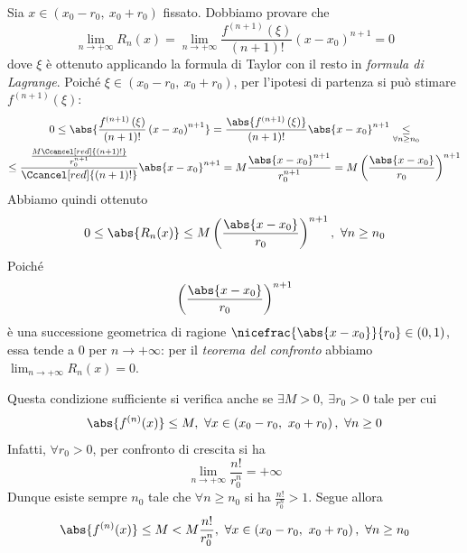 \begin{demonstration}
	Sia $x\in\left(x_0-r_0,\ x_0+r_0\right)$ fissato. Dobbiamo provare che
	\begin{equation*}
		\lim_{n\to+\infty}R_n(x)=\lim_{n\to+\infty}\frac{f^{\left(n+1\right)}\left(\xi\right)}{\left(n+1\right)!}\left(x-x_0\right)^{n+1}=0
	\end{equation*}
dove $\xi$ è ottenuto applicando la formula di Taylor con il resto in \textit{formula di Lagrange}. Poiché $\xi\in\left(x_0-r_0,\ x_0+r_0\right)$, per l'ipotesi di partenza si può stimare $f^{\left(n+1\right)}\left(\xi\right)$:
\begin{gather*}
	0\leq \abs{\frac{f^{\left(n+1\right)}\left(\xi\right)}{\left(n+1\right)!}\left(x-x_0\right)^{n+1}} =\frac{\abs{f^{\left(n+1\right)}\left(\xi\right)}}{\left(n+1\right)!}\abs{x-x_0}^{n+1} \underset{\forall n\geq n_0}{\leq} \\ \leq \frac{\frac{M\Ccancel[red]{\left(n+1\right)!}}{r_0^{n+1}}}{\Ccancel[red]{\left(n+1\right)!}}\abs{x-x_0}^{n+1}
	=M\frac{\abs{x-x_0}^{n+1}}{r_0^{n+1}}=M\left(\frac{\abs{x-x_0}}{r_0}\right)^{n+1}
\end{gather*}
Abbiamo quindi ottenuto
\begin{equation*}
	0\leq \abs{R_n(x)}\leq M\left(\frac{\abs{x-x_0}}{r_0}\right)^{n+1},\ \forall n\geq n_0
\end{equation*}
Poiché
\begin{equation*}
	\left(\frac{\abs{x-x_0}}{r_0}\right)^{n+1}
\end{equation*}
è una successione geometrica di ragione $\nicefrac{\abs{x-x_0}}{r_0}\in\left(0,1\right)$, essa tende a $0$ per $n\to+\infty$: per il \textit{teorema del confronto} abbiamo $\displaystyle\lim_{n\to+\infty}R_n(x)=0$.
\end{demonstration}
\begin{observe}
	Questa condizione sufficiente si verifica anche se $\exists M>0,\ \exists r_0>0$ tale per cui
	\begin{equation}\label{condizionesufficientederivatelimitate}
		\abs{f^{\left(n\right)}(x)}\leq M,\ \forall x\in\left(x_0-r_0,\ x_0+r_0\right),\ \forall n\geq 0
	\end{equation}
Infatti, $\forall r_0>0$, per confronto di crescita si ha
\begin{equation*}
	\lim_{n\to+\infty}\frac{n!}{r_0^n}=+\infty
\end{equation*}
Dunque esiste sempre $n_0$ tale che $\forall n\geq n_0$ si ha $\frac{n!}{r_0^n}>1$. Segue allora
\begin{equation*}
	\abs{f^{\left(n\right)}(x)}\leq M<M\frac{n!}{r_0^n},\ \forall x\in\left(x_0-r_0,\ x_0+r_0\right),\ \forall n\geq n_0
\end{equation*}
\end{observe}
